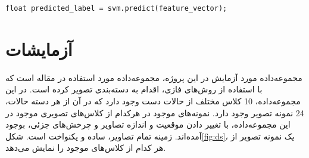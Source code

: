 \documentclass[11.5pt,a4paper]{article}
\begin{document}
 \begin{LTR}
    \begin{lstlisting}[style=C++Style,caption=\rl{پیش‌بینی با استفاده از دسته‌بندی‌کننده \lr{SVM}}]
	float predicted_label = svm.predict(feature_vector);
    \end{lstlisting}
    \label{prg:svmtrn}
  \end{LTR}
 
 

\section{ آزمایشات}

مجموعه‌داده مورد آزمایش در این پروژه، مجموعه‌داده مورد استفاده در مقاله \cite{kumar2010hand} است که با استفاده از روش‌های فازی، اقدام به دسته‌بندی تصویر کرده است. در این مجموعه‌داده، 10 کلاس مختلف از حالات دست وجود دارد که در آن از هر دسته حالات، 24 نمونه تصویر وجود دارد. نمونه‌های موجود در هرکدام از کلاس‌های تصویری موجود در این مجموعه‌داده، با تغییر دادن موقعیت و اندازه تصاویر و چرخش‌های جزئی، بوجود آمده‌اند. زمینه تمام تصاویر، ساده و یکنواخت است. شکل\ref{fig:ds}، یک نمونه تصویر از هر کدام از کلاس‌های موجود را نمایش می‌دهد.
\end{document}
